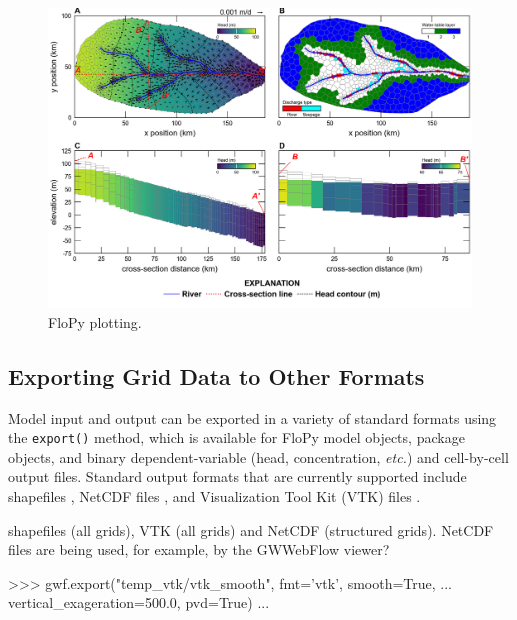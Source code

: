 \documentclass[11pt, oneside]{article}  	%
\begin{document}

\begin{figure}[ht!]
	\begin{center}
		\includegraphics{figures/grids_flopy_plots.png}
	\end{center}
	\caption{FloPy plotting.}
	\label{fig:flopyplots}
\end{figure}


\subsection{Exporting Grid Data to Other Formats}

Model input and output can be exported in a variety of standard formats using the \texttt{export()} method, which is available for FloPy model objects, package objects, and binary dependent-variable (head, concentration, \textit{etc.}) and cell-by-cell output files. Standard output formats that are currently supported include shapefiles \citep{environmental1998esri}, NetCDF files \citep{rew2006netcdf, rew1990netcdf}, and Visualization Tool Kit (VTK) files \citep{schroeder:2006:VTK}.

shapefiles (all grids), VTK (all grids) and NetCDF (structured grids). NetCDF files are being used, for example, by the GWWebFlow viewer? 

\begin{python}
>>> gwf.export("temp_vtk/vtk_smooth", fmt='vtk', smooth=True,
... vertical_exageration=500.0, pvd=True)
...
\end{python}

\end{document}
